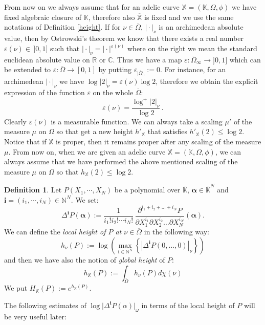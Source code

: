 \documentclass[10 pt,a4paper]{article}
\theoremstyle{plain}
\theoremstyle{definition}
\newtheorem{defn}[thm]{Definition}
\theoremstyle{named}
\begin{document}
From now on we always assume that for an adelic curve $\mathbb X=(\mathbb K, \Omega,\phi)$ we have fixed algebraic closure of $\mathbb K$, therefore also $\overline{\mathbb X}$ is fixed and we use the same notations of Definition \ref{height}.
If for $\nu\in\overline\Omega$, $\vert\cdot\vert_\nu$ is an archimedean absolute value, then by Ostrowski's theorem we know that there exists a real number $\varepsilon(\nu)\in\,]0,1]$ such that $\vert\cdot\vert_\nu=\vert\cdot\vert^{\varepsilon(\nu)}$ where on the right we mean the standard euclidean absolute value on $\mathbb R$ or $\mathbb C$. Thus we have a map $\varepsilon:\overline\Omega_{\infty}\to ]0,1]$ which can be extended to  $\varepsilon:\overline\Omega\to [0,1]$ by putting $\varepsilon_{|\overline\Omega_0}:=0$. For instance,  for an archimedean $\vert\cdot\vert_\nu$ we have $\log \vert 2\vert_\nu=\varepsilon(\nu)\log 2$, therefore we obtain the explicit expression of the function  $\varepsilon$ on the whole $\overline\Omega$:
$$\varepsilon(\nu)=\frac{\log^+\vert2\vert_\nu}{\log 2}\,.$$
Clearly $\varepsilon(\nu)$ is a measurable function. We can always take a  scaling  $\mu'$ of the measure $\mu$ on $\Omega$
so that  get a new height $h'_{\mathbb X}$ that  satisfies $h'_{\mathbb X}(2)\le\log 2$.  Notice that if $\mathbb X$ is proper, then it remains proper after any scaling of the measure $\mu$.  From now on, when we are given an adelic curve $\mathbb X=(\mathbb K, \Omega,\phi)$, we can always assume that we have performed the above mentioned scaling  of the measure $\mu$ on $\Omega$ so that $h_{\mathbb X}(2)\le \log 2$.
\begin{defn}
Let $P(X_1,\cdots ,X_N)$ be a polynomial over $\overline{\mathbb K}$, $\bm{\alpha}\in \overline{\mathbb K}^N$ and $\bm i=(i_1,\cdots ,i_N)\in \mathbb N^N$. We set:
$$
\Delta^{\bm i}P(\bm{\alpha}):=\frac{1}{i_1!i_2!\cdots i_N!}\,\frac{\partial^{i_1+i_2+\ldots+i_N}P}{\partial X^{i_1}_1 \partial X^{i_2}_2\ldots \partial X^{i_N}_N}(\bm{\alpha}).
$$
We can define the \emph{local height of $P$ at $\nu\in\overline\Omega$} in the following way:
$$h_{\nu}(P):=\log\left(\max_{\bm i\in\mathbb N^N}\left\{\left |\Delta^{\bm i} P(0,\ldots,0)\right|_{\nu}\right\}\right)$$
and then we have also the notion of \emph{global height} of $P$:
$$h_{\mathbb X}(P):=\int_{\overline\Omega} h_{\nu}(P) d\chi(\nu)$$
We put $H_{\mathbb X}(P):=e^{h_{\mathbb X}(P)}$.
\end{defn}

The following  estimates of $\log\vert\Delta^{\bm i}P(\alpha)\vert_\omega$ in terms of the local height of $P$ will be very useful later:
\end{document}
